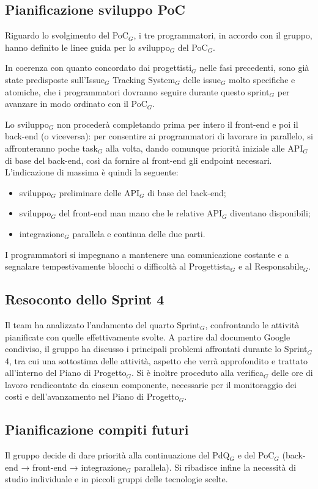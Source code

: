 \documentclass[a4paper, 10pt, colorlinks=true, linkcolor=black, urlcolor=blue, citecolor=blue, hidelinks]{article}
\begin{document}
\subsection{Pianificazione sviluppo PoC}
Riguardo lo svolgimento del PoC$_G$, i tre programmatori, in accordo con il gruppo, hanno definito le linee guida per lo sviluppo$_G$ del PoC$_G$.

In coerenza con quanto concordato dai progettisti$_G$ nelle fasi precedenti, sono già state predisposte sull'Issue$_G$ Tracking System$_G$ delle issue$_G$ molto specifiche e atomiche, che i programmatori dovranno seguire durante questo sprint$_G$ per avanzare in modo ordinato con il PoC$_G$.

Lo sviluppo$_G$ non procederà completando prima per intero il front-end e poi il back-end (o viceversa): per consentire ai programmatori di lavorare in parallelo, si affronteranno poche task$_G$ alla volta, dando comunque priorità iniziale alle API$_G$ di base del back-end, così da fornire al front-end gli endpoint necessari. L'indicazione di massima è quindi la seguente:
\begin{itemize}
    \item sviluppo$_G$ preliminare delle API$_G$ di base del back-end;
    \item sviluppo$_G$ del front-end man mano che le relative API$_G$ diventano disponibili;
    \item integrazione$_G$ parallela e continua delle due parti.
\end{itemize}
I programmatori si impegnano a mantenere una comunicazione costante e a segnalare tempestivamente blocchi o difficoltà al Progettista$_G$ e al Responsabile$_G$.

\subsection{Resoconto dello Sprint 4}
Il team ha analizzato l'andamento del quarto Sprint$_G$, confrontando le attività pianificate con quelle effettivamente svolte. A partire dal documento Google condiviso, il gruppo ha discusso i principali problemi affrontati durante lo Sprint$_G$ 4, tra cui una sottostima delle attività, aspetto che verrà approfondito e trattato all'interno del Piano di Progetto$_G$. Si è inoltre proceduto alla verifica$_G$ delle ore di lavoro rendicontate da ciascun componente, necessarie per il monitoraggio dei costi e dell'avanzamento nel Piano di Progetto$_G$.

\subsection{Pianificazione compiti futuri}
Il gruppo decide di dare priorità alla continuazione del PdQ$_G$ e del PoC$_G$ (back-end → front-end → integrazione$_G$ parallela). Si ribadisce infine la necessità di studio individuale e in piccoli gruppi delle tecnologie scelte.
\end{document}
